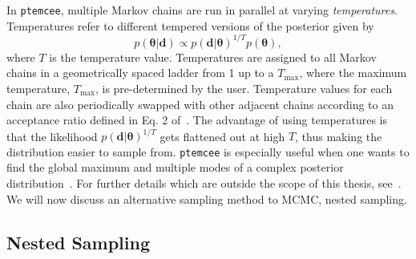 %
%
In \texttt{ptemcee}, multiple Markov chains are run in parallel 
at varying \textit{temperatures}. Temperatures refer to different 
tempered versions of the posterior given by 
%
\begin{equation}
    p(\bm{\theta}|\bm{d}) \propto p(\bm{d}|\bm{\theta})^{1/T} p(\bm{\theta}),
\end{equation}
%
where $T$ is the temperature value. Temperatures are assigned to all 
Markov chains in a geometrically spaced ladder from 1 up to a $T_{\mathrm{max}}$, where the maximum temperature, $T_{\mathrm{max}}$, 
is pre-determined by the user. 
Temperature values for each chain are also periodically swapped with other 
adjacent chains according to an acceptance ratio defined 
in Eq. 2 of~\cite{ptemcee}.
The advantage of using temperatures is that the 
likelihood $p(\bm{d}|\bm{\theta})^{1/T}$ 
gets flattened out at high $T$, thus making the distribution easier to 
sample from. \texttt{ptemcee} is especially useful when one wants to 
find the global maximum and multiple modes of a complex 
posterior distribution~\cite{Reyes2019DETECTIONAI}. 
For further details which are outside the scope of this 
thesis, see~\cite{ptemcee,Reyes2019DETECTIONAI}. We will now 
discuss an alternative sampling method to \ac{MCMC}, nested sampling.

\subsection{Nested Sampling}\label{sec:nested_sampling}

